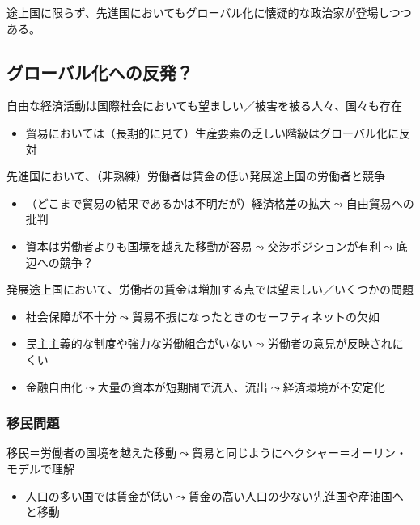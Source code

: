 \documentclass[
  xelatex,
  ja=standard]{bxjsarticle}
\providecommand{\tightlist}{%
  \setlength{\itemsep}{0pt}\setlength{\parskip}{0pt}}\usepackage{longtable,booktabs,array}
\begin{document}
途上国に限らず、先進国においてもグローバル化に懐疑的な政治家が登場しつつある。

\hypertarget{ux30b0ux30edux30fcux30d0ux30ebux5316ux3078ux306eux53cdux767a}{%
\subsection{グローバル化への反発？}\label{ux30b0ux30edux30fcux30d0ux30ebux5316ux3078ux306eux53cdux767a}}

自由な経済活動は国際社会においても望ましい／被害を被る人々、国々も存在

\begin{itemize}
\tightlist
\item
  貿易においては（長期的に見て）生産要素の乏しい階級はグローバル化に反対\citep{mussa1974}
\end{itemize}

先進国において、（非熟練）労働者は賃金の低い発展途上国の労働者と競争

\begin{itemize}
\tightlist
\item
  （どこまで貿易の結果であるかは不明だが）経済格差の拡大\(\leadsto\)自由貿易への批判\citep{flaherty2021}
\item
  資本は労働者よりも国境を越えた移動が容易\(\leadsto\)交渉ポジションが有利\(\leadsto\)底辺への競争？
\end{itemize}

発展途上国において、労働者の賃金は増加する点では望ましい／いくつかの問題

\begin{itemize}
\tightlist
\item
  社会保障が不十分\(\leadsto\)貿易不振になったときのセーフティネットの欠如
\item
  民主主義的な制度や強力な労働組合がいない\(\leadsto\)労働者の意見が反映されにくい
\item
  金融自由化\(\leadsto\)大量の資本が短期間で流入、流出\(\leadsto\)経済環境が不安定化
\end{itemize}

\hypertarget{ux79fbux6c11ux554fux984c}{%
\subsubsection{移民問題}\label{ux79fbux6c11ux554fux984c}}

移民＝労働者の国境を越えた移動\(\leadsto\)貿易と同じようにヘクシャー＝オーリン・モデルで理解

\begin{itemize}
\tightlist
\item
  人口の多い国では賃金が低い\(\leadsto\)賃金の高い人口の少ない先進国や産油国へと移動
\end{itemize}
\end{document}
